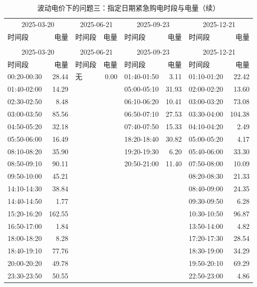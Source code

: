 {\footnotesize\setlength{\tabcolsep}{3pt}
\begin{longtable}{lr|lr|lr|lr}
\caption{波动电价下的问题三：指定日期紧急购电时段与电量（kWh）}\\
\toprule
\multicolumn{2}{c}{2025-03-20} & \multicolumn{2}{c}{2025-06-21} & \multicolumn{2}{c}{2025-09-23} & \multicolumn{2}{c}{2025-12-21}\\
时间段 & 电量 & 时间段 & 电量 & 时间段 & 电量 & 时间段 & 电量\\\midrule\endfirsthead
\caption[]{波动电价下的问题三：指定日期紧急购电时段与电量（续）}\\
\toprule
\multicolumn{2}{c}{2025-03-20} & \multicolumn{2}{c}{2025-06-21} & \multicolumn{2}{c}{2025-09-23} & \multicolumn{2}{c}{2025-12-21}\\
时间段 & 电量 & 时间段 & 电量 & 时间段 & 电量 & 时间段 & 电量\\\midrule\endhead
00:20-00:30 & 28.44 & 无 & 0.00 & 01:40-01:50 & 3.11 & 01:10-01:20 & 22.42\\
01:40-02:00 & 14.29 &  &  & 05:00-05:10 & 31.93 & 02:00-02:20 & 13.60\\
02:30-02:50 & 8.48 &  &  & 06:10-06:20 & 10.41 & 03:00-03:20 & 73.08\\
03:00-03:50 & 85.56 &  &  & 06:50-07:10 & 27.53 & 03:30-04:00 & 104.38\\
04:50-05:20 & 32.18 &  &  & 07:40-07:50 & 15.33 & 04:10-04:20 & 2.49\\
05:50-06:00 & 16.49 &  &  & 18:20-18:40 & 30.82 & 05:00-05:20 & 4.17\\
08:10-08:20 & 35.90 &  &  & 19:20-19:30 & 6.20 & 05:40-06:00 & 33.30\\
08:50-09:10 & 90.11 &  &  & 20:50-21:00 & 11.40 & 07:50-08:00 & 10.09\\
09:50-10:00 & 45.21 &  &  &  &  & 08:20-08:30 & 21.33\\
14:10-14:30 & 38.84 &  &  &  &  & 08:40-09:00 & 24.35\\
14:40-14:50 & 1.77 &  &  &  &  & 09:30-09:50 & 6.28\\
15:20-16:20 & 162.55 &  &  &  &  & 10:30-10:50 & 96.87\\
16:50-17:00 & 1.84 &  &  &  &  & 13:50-14:00 & 4.82\\
18:00-18:20 & 8.28 &  &  &  &  & 17:20-17:30 & 28.54\\
18:40-19:10 & 77.76 &  &  &  &  & 18:30-19:00 & 34.29\\
20:00-20:20 & 49.78 &  &  &  &  & 19:50-20:10 & 69.29\\
23:30-23:50 & 50.55 &  &  &  &  & 22:50-23:00 & 4.86\\
\bottomrule\end{longtable}}
